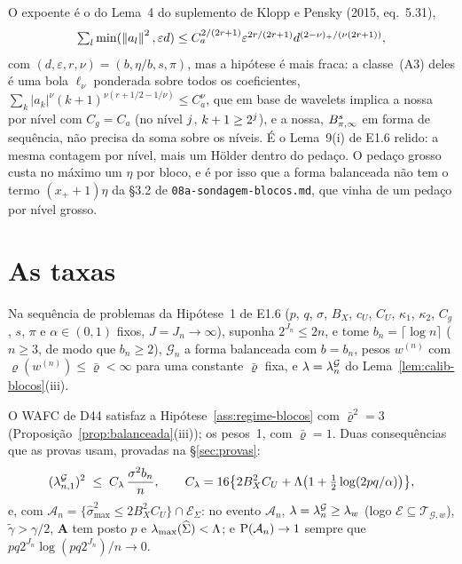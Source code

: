 \documentclass[11pt,a4paper]{article}
\newcommand{\lmaxx}{\lambda_{\max}}
\newcommand{\Amat}{\mathbf{A}}
\newcommand{\smax}{\widehat{\sigma}_{\max}}
\newcommand{\gtil}{\widetilde{\gamma}}
\newcommand{\Gcal}{\mathcal{G}}
\newcommand{\bn}{b_{n}}
\newcommand{\lamG}{\lambda^{\mathcal{G}}_{n}}
\newcommand{\lamGone}{\lambda^{\mathcal{G}}_{n,1}}
\newcommand{\Tw}{\mathcal{T}_{\mathcal{G},w}}
\newcommand{\Ecal}{\mathcal{E}}
\newcommand{\ESig}{\mathcal{E}_{\Sigma}}
\newcommand{\Acal}{\mathcal{A}_{n}}
\begin{document}
O expoente é o do Lema~4 do suplemento de Klopp e Pensky (2015, eq.~5.31),
\[
  \textstyle\sum_{l}\min(\left\lVert a_{l} \right\rVert^{2},\varepsilon d) \le
  C_{a}^{2/(2r+1)}\varepsilon^{2r/(2r+1)}d^{(2-\nu)_{+}/(\nu(2r+1))},
\]
com
$(d,\varepsilon,r,\nu) = (b,\eta/b,s,\pi)$, mas a hipótese é mais fraca: a
classe~(A3) deles é uma bola $\ell_{\nu}$ ponderada sobre todos os
coeficientes,
$\sum_{k}|a_{k}|^{\nu}(k+1)^{\nu(r+1/2-1/\nu)} \le C_{a}^{\nu}$, que em base de wavelets implica a nossa por nível com $C_{g} = C_{a}$ (no
nível $j$, $k+1 \ge 2^{j}$), e a nossa, $B^{s}_{\pi,\infty}$ em
forma de sequência, não precisa da soma sobre os níveis. É o Lema~9(i) de
E1.6 relido: a mesma contagem por nível, mais um Hölder dentro do pedaço. O
pedaço grosso custa no máximo um $\eta$ por bloco, e é por isso que a forma
balanceada não tem o termo $(x_{+}+1)\eta$ da §3.2 de
\texttt{08a-sondagem-blocos.md}, que vinha de um pedaço por nível grosso.

\section{As taxas}\label{sec:taxas}

\begin{assumption}\label{ass:regime-blocos}
Na sequência de problemas da Hipótese~1 de E1.6 ($p$, $q$, $\sigma$, $B_{X}$,
$c_{U}$, $C_{U}$, $\kappa_{1}$, $\kappa_{2}$, $C_{g}$, $s$, $\pi$ e
$\alpha \in (0,1)$ fixos, $J = J_{n} \to \infty$), suponha $2^{J_{n}} \le 2n$,
e tome $\bn = \lceil\log n\rceil$ ($n \ge 3$, de modo que $\bn \ge 2$),
$\Gcal_{n}$ a forma balanceada com $b = \bn$, pesos $w^{(n)}$ com
$\varrho(w^{(n)}) \le \bar\varrho < \infty$ para uma constante $\bar\varrho$ fixa, e
$\pen = \lamG$ do Lema~\ref{lem:calib-blocos}(iii).
\end{assumption}

O WAFC de D44 satisfaz a Hipótese~\ref{ass:regime-blocos} com
$\bar\varrho^{2} = 3$ (Proposição~\ref{prop:balanceada}(iii)); os pesos~1, com
$\bar\varrho = 1$. Duas consequências que as provas usam, provadas na §\ref{sec:provas}:
\begin{equation}
  \label{eq:ordem-lambda}
  (\lamGone)^{2} \;\le\; C_{\pen}\,\frac{\sigma^{2}\bn}{n},
  \qquad
  C_{\pen} = 16\bigl\{2B_{X}^{2}C_{U} + \Lambda\bigl(1 + \tfrac12\log(2pq/\alpha)\bigr)\bigr\},
\end{equation}
e, com $\Acal = \{\smax^{2} \le 2B_{X}^{2}C_{U}\} \cap \ESig$: no evento
$\Acal$, $\pen = \lamG \ge \pen_{w}$ (logo $\Ecal \subseteq \Tw$),
$\gtil > \gamma/2$, $\Amat$ tem posto $p$ e $\lmaxx(\Gramhat) < \Lambda$; e
$\Prob(\Acal) \to 1$ sempre que $pq2^{J_{n}}\log(pq2^{J_{n}})/n \to 0$.
\end{document}
